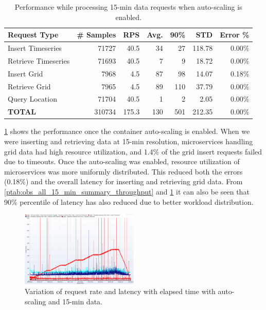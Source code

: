 \documentclass[conference]{IEEEtran}
\begin{document}
\begin{table}[tb!]
\caption{Performance while processing 15-min data requests when auto-scaling is enabled.}
\begin{center}
\begin{adjustbox}{width=0.45\textwidth}
\footnotesize
\begin{tabular}{|l|r|r|r|r|r|r|}
\hline
\textbf{Request Type} & \textbf{\# Samples} & \textbf{RPS} & \textbf{Avg.} & \textbf{90\%} & \textbf{STD} & \textbf{Error \%}\\ \hline
Insert Timeseries & 71727 & 40.5 & 34 & 27 & 118.78 & 0.00\% \\ \hline
Retrieve Timeseries & 71693 & 40.5 & 7 & 9 & 18.72 & 0.00\% \\ \hline
Insert Grid & 7968 & 4.5 & 87 & 98 & 14.07 & 0.18\% \\ \hline
Retrieve Grid & 7965 & 4.5 & 89 & 110 & 37.79 & 0.00\% \\ \hline
Query Location & 71704 & 40.5 & 1 & 2 & 2.05 & 0.00\% \\ \hline
\textbf{TOTAL} & 310734 & 175.3 & 130 & 501 & 212.35 & 0.00\% \\ \hline
\end{tabular}
\end{adjustbox}
\label{ptab:obs_all_auto_15_min_summary_throughput}
\end{center}
\end{table}

\cref{ptab:obs_all_auto_15_min_summary_throughput} shows the performance once the container auto-scaling is enabled. When we were inserting and retrieving data at 15-min resolution, microservices handling grid data had high resource utilization, and 1.4\% of the grid insert requests failed due to timeouts. Once the auto-scaling was enabled, resource utilization of microservices was more uniformly distributed. This reduced both the errors (0.18\%) and the overall latency for inserting and retrieving grid data. From \cref{ptab:obs_all_15_min_summary_throughput} and \cref{ptab:obs_all_auto_15_min_summary_throughput} it can also be seen that 90\% percentile of latency has also reduced due to better workload distribution.

\begin{figure}[!tb]
\centerline{\includegraphics[width=0.5\textwidth]{results/obs/all_auto/obs_all_auto_15m_res_latencies_against_hits.png}}
\caption{Variation of request rate and latency with elapsed time with auto-scaling and 15-min data.}
\label{pfi:test_obs_auto_all_15_min_latency_vs_hits}
\end{figure}
\end{document}
